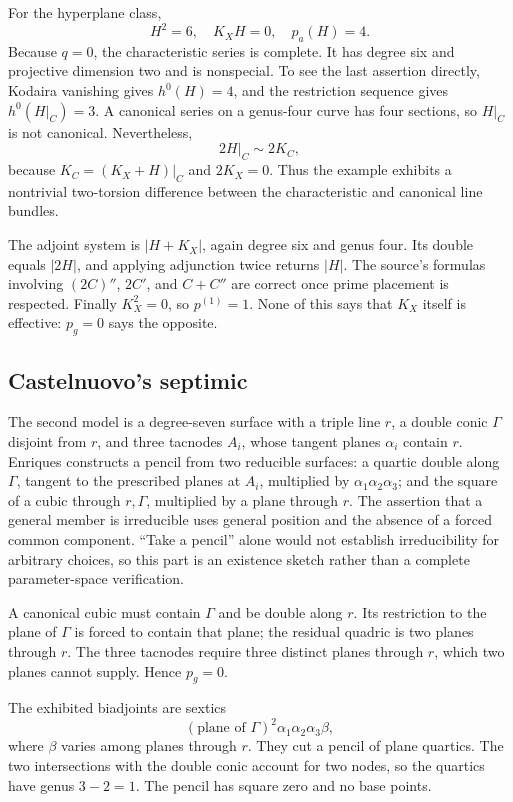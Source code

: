 For the hyperplane class, \[
H^2=6,\quad K_XH=0,\quad p_a(H)=4.
\] Because \(q=0\), the characteristic series is complete. It has degree six and projective dimension two and is nonspecial. To see the last assertion directly, Kodaira vanishing gives \(h^0(H)=4\), and the restriction sequence gives \(h^0(H|_C)=3\). A canonical series on a genus-four curve has four sections, so \(H|_C\) is not canonical. Nevertheless, \[
2H|_C\sim2K_C,
\] because \(K_C=(K_X+H)|_C\) and \(2K_X=0\). Thus the example exhibits a nontrivial two-torsion difference between the characteristic and canonical line bundles.

The adjoint system is \(|H+K_X|\), again degree six and genus four. Its double equals \(|2H|\), and applying adjunction twice returns \(|H|\). The source's formulas involving \((2C)''\), \(2C'\), and \(C+C''\) are correct once prime placement is respected. Finally \(K_X^2=0\), so \(p^{(1)}=1\). None of this says that \(K_X\) itself is effective: \(p_g=0\) says the opposite.

\subsection{Castelnuovo's septimic}

The second model is a degree-seven surface with a triple line \(r\), a double conic \(\Gamma\) disjoint from \(r\), and three tacnodes \(A_i\), whose tangent planes \(\alpha_i\) contain \(r\). Enriques constructs a pencil from two reducible surfaces: a quartic double along \(\Gamma\), tangent to the prescribed planes at \(A_i\), multiplied by \(\alpha_1\alpha_2\alpha_3\); and the square of a cubic through \(r,\Gamma\), multiplied by a plane through \(r\). The assertion that a general member is irreducible uses general position and the absence of a forced common component. ``Take a pencil'' alone would not establish irreducibility for arbitrary choices, so this part is an existence sketch rather than a complete parameter-space verification.

A canonical cubic must contain \(\Gamma\) and be double along \(r\). Its restriction to the plane of \(\Gamma\) is forced to contain that plane; the residual quadric is two planes through \(r\). The three tacnodes require three distinct planes through \(r\), which two planes cannot supply. Hence \(p_g=0\).

The exhibited biadjoints are sextics \[
(\text{plane of }\Gamma)^2\alpha_1\alpha_2\alpha_3\beta,
\] where \(\beta\) varies among planes through \(r\). They cut a pencil of plane quartics. The two intersections with the double conic account for two nodes, so the quartics have genus \(3-2=1\). The pencil has square zero and no base points.


